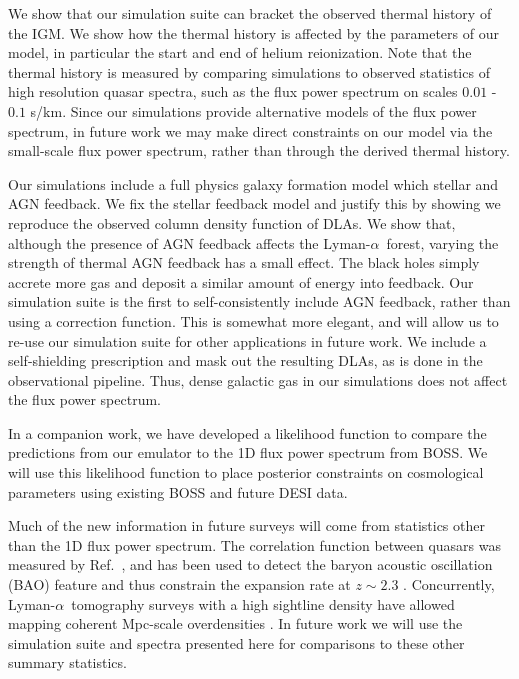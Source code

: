 \documentclass[a4paper,11pt]{article}
\newcommand{\Lya}{Lyman-$\alpha$}
\begin{document}
We show that our simulation suite can bracket the observed thermal history of the IGM. We show how the thermal history is affected by the parameters of our model, in particular the start and end of helium reionization. Note that the thermal history is measured by comparing simulations to observed statistics of high resolution quasar spectra, such as the flux power spectrum on scales $0.01$ - $0.1$ s/km. Since our simulations provide alternative models of the flux power spectrum, in future work we may make direct constraints on our model via the small-scale flux power spectrum, rather than through the derived thermal history.

Our simulations include a full physics galaxy formation model which stellar and AGN feedback. We fix the stellar feedback model and justify this by showing we reproduce the observed column density function of DLAs. We show that, although the presence of AGN feedback affects the
\Lya~forest, varying the strength of thermal AGN feedback has a small effect. The black holes simply accrete more gas and deposit a similar amount of energy into feedback. Our simulation suite is the first to self-consistently include AGN feedback, rather than using a correction function. This is somewhat more elegant, and will allow us to re-use our simulation suite for other applications in future work. We include a self-shielding prescription and mask out the resulting DLAs, as is done in the observational pipeline. Thus, dense galactic gas in our simulations does not affect the flux power spectrum.

In a companion work, we have developed a likelihood function to compare the predictions from our emulator to the 1D flux power spectrum from BOSS. We will use this likelihood function to place posterior constraints on cosmological parameters using existing BOSS and future DESI data.

Much of the new information in future surveys will come from statistics other than the 1D flux power spectrum. The correlation function between quasars was measured by Ref.~\cite{Slosar:2011}, and has been used to detect the baryon acoustic oscillation (BAO) feature and thus constrain the expansion rate at $z\sim 2.3$ \cite{dSAgathe:2019, Cuceu:2022}. Concurrently, \Lya~tomography surveys with a high sightline density have allowed mapping coherent Mpc-scale overdensities \cite{Lee:CLAMATO, LATIS, Qezlou:2022}. In future work we will use the simulation suite and spectra presented here for comparisons to these other summary statistics.
\end{document}
